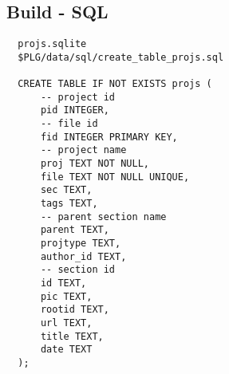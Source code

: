  
 
 
 
 

\subsection{Build - SQL}
\label{sec:build.sql}

\begin{verbatim}
  projs.sqlite 
  $PLG/data/sql/create_table_projs.sql

  CREATE TABLE IF NOT EXISTS projs (
      -- project id
      pid INTEGER,
      -- file id
      fid INTEGER PRIMARY KEY,
      -- project name
      proj TEXT NOT NULL, 
      file TEXT NOT NULL UNIQUE,
      sec TEXT, 
      tags TEXT, 
      -- parent section name
      parent TEXT,
      projtype TEXT,
      author_id TEXT,
      -- section id
      id TEXT,
      pic TEXT,
      rootid TEXT,
      url TEXT,
      title TEXT,
      date TEXT
  );
\end{verbatim}
